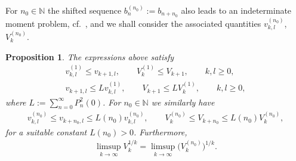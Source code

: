 \documentclass[pdftex]{sigma}
\numberwithin{equation}{section}
\newtheorem{prop}[thm]{Proposition}
\begin{document}
For $n_0\in\mathbb N$ the shifted sequence $b_n^{(n_0)}:=b_{n+n_0}$ also leads to an indeterminate moment problem, cf.~\cite[p.~28]{Ak}, and we shall consider the associated quantities $v_{k,l}^{(n_0)}$, $V_k^{(n_0)}$.

\begin{prop}\label{thm:shiftV1} The expressions above satisfy
\begin{gather}\label{eq:shiftV1}
v_{k,l}^{(1)}\le v_{k+1,l},\qquad V_k^{(1)}\le V_{k+1},\qquad k,l\ge 0,\\
\label{eq:shiftV2}
v_{k+1,l}\le L v_{k,l}^{(1)},\qquad V_{k+1}\le L V_k^{(1)},\qquad k,l\ge 0,
\end{gather}
where $L:=\sum\limits_{n=0}^\infty P_n^2(0)$. For $n_0\in\mathbb N$ we similarly have
\begin{gather}\label{eq:shiftV1a}
v_{k,l}^{(n_0)}\le v_{k+n_0,l}\le L(n_0) v_{k,l}^{(n_0)},\qquad V_k^{(n_0)}\le V_{k+n_0}\le L(n_0) V_k^{(n_0)},
\end{gather}
for a suitable constant $L(n_0)>0$. Furthermore,
\begin{gather} \label{eq:shiftV3}
\limsup_{k\to\infty} V_k^{1/k}=\limsup_{k\to\infty} \big(V_k^{(n_0)}\big)^{1/k}.
\end{gather}
\end{prop}
\end{document}
